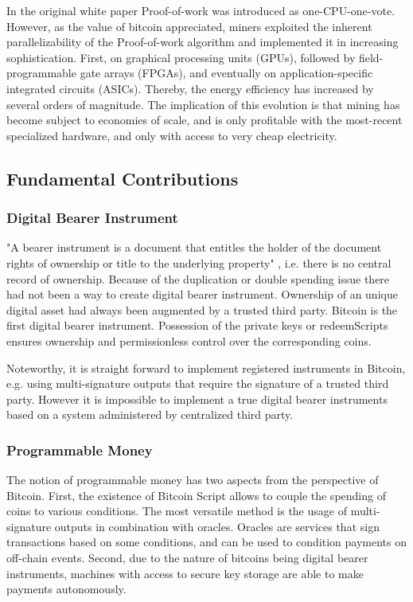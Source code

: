 In the original white paper Proof-of-work was introduced as one-CPU-one-vote. However, as the value of bitcoin appreciated, miners exploited the inherent parallelizability of the Proof-of-work algorithm and implemented it in increasing sophistication. First, on graphical processing units (GPUs), followed by field-programmable gate arrays (FPGAs), and eventually on application-specific integrated circuits (ASICs). Thereby, the energy efficiency has increased by several orders of magnitude. The implication of this evolution is that mining has become subject to economies of scale, and is only profitable with the most-recent specialized hardware, and only with access to very cheap electricity.   



\subsection{Fundamental Contributions}
\label{sec:btc_cont}

\subsubsection{Digital Bearer Instrument}

"A bearer instrument is a document that entitles the holder of the document rights of ownership or title to the underlying property" \cite{bearer}, i.e. there is no central record of ownership. Because of the duplication or double spending issue there had not been a way to create digital bearer instrument. Ownership of an unique digital asset had always been augmented by a trusted third party. Bitcoin is the first digital bearer instrument. Possession of the private keys or redeemScripts ensures ownership and permissionless control over the corresponding coins.

Noteworthy, it is straight forward to implement registered instruments in Bitcoin, e.g. using multi-signature outputs that require the signature of a trusted third party. However it is impossible to implement a true digital bearer instruments based on a system administered by centralized third party.

\subsubsection{Programmable Money}

The notion of programmable money has two aspects from the perspective of Bitcoin. First, the existence of Bitcoin Script allows to couple the spending of coins to various conditions. The most versatile method is the usage of multi-signature outputs in combination with oracles. Oracles are services that sign transactions based on some conditions, and can be used to condition payments on off-chain events. Second, due to the nature of bitcoins being digital bearer instruments, machines with access to secure key storage are able to make payments autonomously.  

